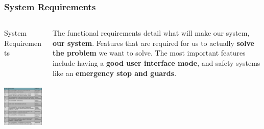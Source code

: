 \documentclass[aspectratio=169]{beamer}
\begin{document}
\begin{frame}
    \frametitle{System Requirements}

    \begin{columns}
        \begin{column}{0.48\textwidth}
            \begin{block}{System Requirements}
                \includegraphics[height=5cm]{FunctionalRequirements}
            \end{block}
        \end{column}

        \begin{column}{0.48\textwidth}
            The functional requirements detail what will make our system, \textbf{our system}. Features
            that are required for us to actually \textbf{solve the problem} we want to solve.
            The most important features include having a \textbf{good user interface mode}, and safety
            systems like an \textbf{emergency stop and guards}.
        \end{column}
    \end{columns}
\end{frame}
\end{document}
